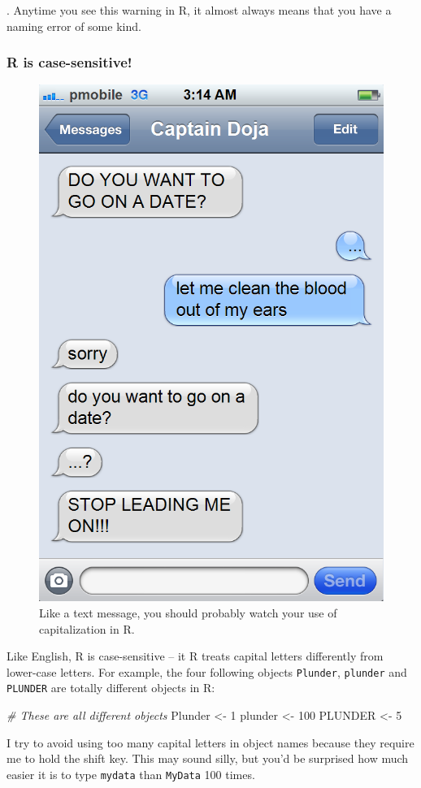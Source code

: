 \documentclass[
]{book}
\newenvironment{Shaded}{\begin{snugshade}}{\end{snugshade}}
\newcommand{\CommentTok}[1]{\textcolor[rgb]{0.56,0.35,0.01}{\textit{#1}}}
\newcommand{\DecValTok}[1]{\textcolor[rgb]{0.00,0.00,0.81}{#1}}
\newcommand{\NormalTok}[1]{#1}
\newcommand{\StringTok}[1]{\textcolor[rgb]{0.31,0.60,0.02}{#1}}
\begin{document}
. Anytime you see this warning in R, it almost always means that you have a naming error of some kind.

\hypertarget{r-is-case-sensitive}{%
\subsubsection{R is case-sensitive!}\label{r-is-case-sensitive}}

\begin{figure}

{\centering \includegraphics[width=0.5\linewidth]{images/datetext} 

}

\caption{Like a text message, you should probably watch your use of capitalization in R.}\label{fig:datetext}
\end{figure}

Like English, R is case-sensitive -- it R treats capital letters differently from lower-case letters. For example, the four following objects \texttt{Plunder}, \texttt{plunder} and \texttt{PLUNDER} are totally different objects in R:

\begin{Shaded}
\begin{Highlighting}[]
\CommentTok{# These are all different objects}
\NormalTok{Plunder <-}\StringTok{ }\DecValTok{1}
\NormalTok{plunder <-}\StringTok{ }\DecValTok{100}
\NormalTok{PLUNDER <-}\StringTok{ }\DecValTok{5}
\end{Highlighting}
\end{Shaded}

I try to avoid using too many capital letters in object names because they require me to hold the shift key. This may sound silly, but you'd be surprised how much easier it is to type \texttt{mydata} than \texttt{MyData} 100 times.
\end{document}

